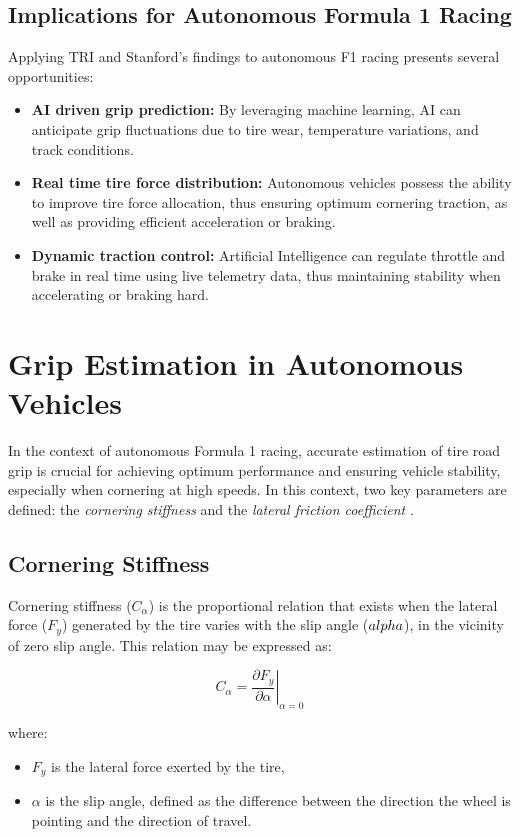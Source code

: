 \documentclass[a4paper,final,12pt]{report}
\begin{document}
\subsection{Implications for Autonomous Formula 1 Racing}
Applying TRI and Stanford’s findings to autonomous F1 racing presents several opportunities:
\begin{itemize}
    \item \textbf{AI driven grip prediction:} By leveraging machine learning, AI can anticipate grip fluctuations due to tire wear, temperature variations, and track conditions.
    \item \textbf{Real time tire force distribution:} Autonomous vehicles possess the ability to improve tire force allocation, thus ensuring optimum cornering traction, as well as providing efficient acceleration or braking.
    \item \textbf{Dynamic traction control:} Artificial Intelligence can regulate throttle and brake in real time using live telemetry data, thus maintaining stability when accelerating or braking hard.
\end{itemize}

\section{Grip Estimation in Autonomous Vehicles}
In the context of autonomous Formula 1 racing, accurate estimation of tire road grip is crucial for achieving optimum performance and ensuring vehicle stability, especially when cornering at high speeds. In this context, two key parameters are defined: the \textit{cornering stiffness} and the \textit{lateral friction coefficient} \cite{Savarese2017}.

\subsection{Cornering Stiffness}
Cornering stiffness ($C_\alpha$) is the proportional relation that exists when the lateral force ($F_y$) generated by the tire varies with the slip angle ($\\alpha$), in the vicinity of zero slip angle\cite{Hwang2018}. This relation may be expressed as:

\begin{equation}
C_\alpha = \left. \frac{\partial F_y}{\partial \alpha} \right|_{\alpha=0}
\end{equation}

where:
\begin{itemize}
    \item $F_y$ is the lateral force exerted by the tire,
    \item $\alpha$ is the slip angle, defined as the difference between the direction the wheel is pointing and the direction of travel.
\end{itemize}
\end{document}
